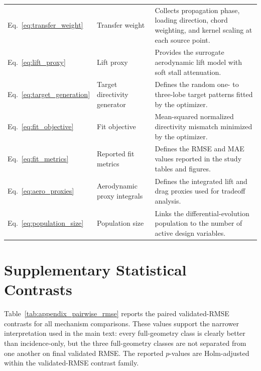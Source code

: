 \documentclass[11pt]{article}
\begin{document}
\begin{longtable}{@{}L{0.15\textwidth}L{0.27\textwidth}L{0.52\textwidth}@{}}
Eq.~\ref{eq:transfer_weight} & Transfer weight & Collects propagation phase, loading direction, chord weighting, and kernel scaling at each source point. \\
Eq.~\ref{eq:lift_proxy} & Lift proxy & Provides the surrogate aerodynamic lift model with soft stall attenuation. \\
Eq.~\ref{eq:target_generation} & Target directivity generator & Defines the random one- to three-lobe target patterns fitted by the optimizer. \\
Eq.~\ref{eq:fit_objective} & Fit objective & Mean-squared normalized directivity mismatch minimized by the optimizer. \\
Eq.~\ref{eq:fit_metrics} & Reported fit metrics & Defines the RMSE and MAE values reported in the study tables and figures. \\
Eq.~\ref{eq:aero_proxies} & Aerodynamic proxy integrals & Defines the integrated lift and drag proxies used for tradeoff analysis. \\
Eq.~\ref{eq:population_size} & Population size & Links the differential-evolution population to the number of active design variables. \\
\end{longtable}

\clearpage

\section{Supplementary Statistical Contrasts}

Table~\ref{tab:appendix_pairwise_rmse} reports the paired validated-RMSE contrasts for all mechanism comparisons. These values support the narrower interpretation used in the main text: every full-geometry class is clearly better than incidence-only, but the three full-geometry classes are not separated from one another on final validated RMSE. The reported $p$-values are Holm-adjusted within the validated-RMSE contrast family.
\end{document}
